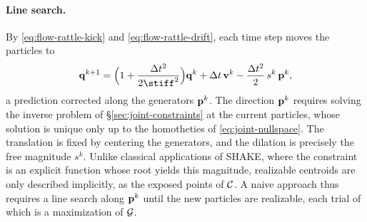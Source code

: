 \documentclass[main.tex]{subfiles}
\begin{document}
\paragraph{Line search.}
By \eqref{eq:flow-rattle-kick} and \eqref{eq:flow-rattle-drift}, each time step moves the particles to
\begin{equation}
  \qq^{k+1} = \Bigl( 1 + \frac{\tstep^2}{2\stiff^2} \Bigr) \qq^k + \tstep\, \vel^k - \frac{\tstep^2}{2}\, s^k\, \dual^k ,
  \label{eq:flow-shake-step}
\end{equation}
\ie a prediction corrected along the generators $\mathbf{p}^k$.
The direction $\mathbf{p}^k$ requires solving the inverse problem of \S\ref{sec:joint-constraints} at the current particles, whose solution is unique only up to the homotheties of \eqref{eq:joint-nullspace}.
The translation is fixed by centering the generators, and the dilation is precisely the free magnitude $s^k$.
Unlike classical applications of SHAKE, where the constraint is an explicit function whose root yields this magnitude, realizable centroids are only described implicitly, as the exposed points of $\mathcal{C}$.
A naive approach thus requires a line search along $\mathbf{p}^k$ until the new particles are realizable, each trial of which is a maximization of $\mathcal{G}$.
\end{document}
